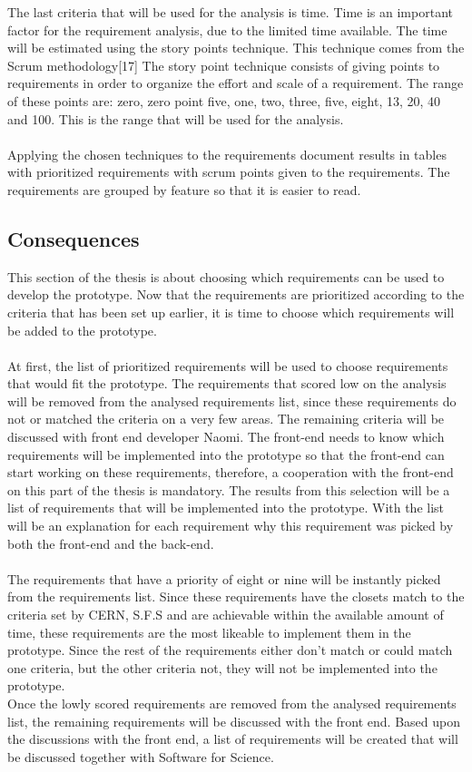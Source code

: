 \documentclass[paper=a4, fontsize=11pt,twoside]{scrartcl}	%
\begin{document}
The last criteria that will be used for the analysis is time. Time is an important factor for the requirement analysis, due to the limited time available. The time will be estimated using the story points technique. This technique comes from the Scrum methodology[17] The story point technique consists of giving points to requirements in order to organize the effort and scale of a requirement. The range of these points are:  zero, zero point five, one, two, three, five, eight, 13, 20, 40 and 100. This is the range that will be used for the analysis. \\ \\
Applying the chosen techniques to the requirements document results in tables with prioritized requirements with scrum points given to the requirements. The requirements are grouped by feature so that it is easier to read. \\

\newpage
\subsection{Consequences}
This section of the thesis is about choosing which requirements can be used to develop the prototype. Now that the requirements are prioritized according to the criteria that has been set up earlier, it is time to choose which requirements will be added to the prototype. \\ \\ 
At first, the list of prioritized requirements will be used to choose requirements that would fit the prototype. The requirements that scored low on the analysis will be removed from the analysed requirements list, since these requirements do not or matched the criteria on a very few areas. The remaining criteria will be discussed with front end developer Naomi. The front-end needs to know which requirements will be implemented into the prototype so that the front-end can start working on these requirements, therefore, a cooperation with the front-end on this part of the thesis is mandatory. The results from this selection will be a list of requirements that will be implemented into the prototype. With the list will be an explanation for each requirement why this requirement was picked by both the front-end and the back-end. \\ \\
The requirements that have a priority of eight or nine will be instantly picked from the requirements list. Since these requirements have the closets match to the criteria set by CERN, S.F.S and are achievable within the available amount of time, these requirements are the most likeable to implement them in the prototype. Since the rest of the requirements either don't match or could match one criteria, but the other criteria not, they will not be implemented into the prototype. \\
Once the lowly scored requirements are removed from the analysed requirements list, the remaining requirements will be discussed with the front end. Based upon the discussions with the front end, a list of requirements will be created that will be discussed together with Software for Science. \\
\end{document}
